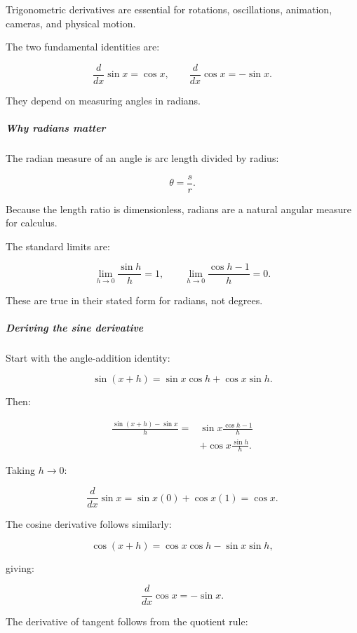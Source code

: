 \hypertarget{01-foundations-i-ch020-trigonometric-differentiation}{}

Trigonometric derivatives are essential for rotations, oscillations, animation, cameras, and physical motion.

The two fundamental identities are:

\[
\boxed{\frac d{dx}\sin x=\cos x}, \qquad \boxed{\frac d{dx}\cos x=-\sin x}.
\]

They depend on measuring angles in radians.

\subparagraph{Why radians matter}\label{01-foundations-i-ch020-why-radians-matter}

\hypertarget{01-foundations-i-ch020-why-radians-matter}{}

The radian measure of an angle is arc length divided by radius:

\[
\theta=\frac{s}{r}.
\]

Because the length ratio is dimensionless, radians are a natural angular measure for calculus.

The standard limits are:

\[
\lim_{h\to0}\frac{\sin h}{h}=1, \qquad \lim_{h\to0}\frac{\cos h-1}{h}=0.
\]

These are true in their stated form for radians, not degrees.

\subparagraph{Deriving the sine derivative}\label{01-foundations-i-ch020-deriving-the-sine-derivative}

\hypertarget{01-foundations-i-ch020-deriving-the-sine-derivative}{}

Start with the angle-addition identity:

\[
\sin(x+h)=\sin x\cos h+\cos x\sin h.
\]

Then:

\[
\begin{aligned} \frac{\sin(x+h)-\sin x}{h} =&\sin x\frac{\cos h-1}{h}\\ &+\cos x\frac{\sin h}{h}. \end{aligned}
\]

Taking \(h\to0\):

\[
\frac d{dx}\sin x =\sin x(0)+\cos x(1) =\cos x.
\]

The cosine derivative follows similarly:

\[
\cos(x+h)=\cos x\cos h-\sin x\sin h,
\]

giving:

\[
\frac d{dx}\cos x=-\sin x.
\]

The derivative of tangent follows from the quotient rule:

